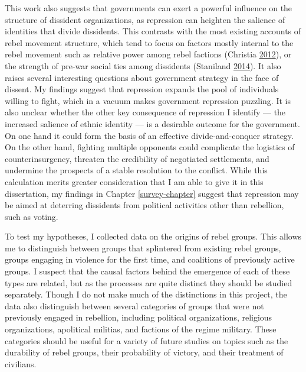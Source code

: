 \documentclass[12pt,]{book}
\theoremstyle{definition}
\theoremstyle{definition}
\theoremstyle{definition}
\theoremstyle{remark}
\begin{document}
This work also suggests that governments can exert a powerful influence
on the structure of dissident organizations, as repression can heighten
the salience of identities that divide dissidents. This contrasts with
the most existing accounts of rebel movement structure, which tend to
focus on factors mostly internal to the rebel movement such as relative
power among rebel factions (Christia
\protect\hyperlink{ref-Christia2012}{2012}), or the strength of pre-war
social ties among dissidents (Staniland
\protect\hyperlink{ref-Staniland2014}{2014}). It also raises several
interesting questions about government strategy in the face of dissent.
My findings suggest that repression expands the pool of individuals
willing to fight, which in a vacuum makes government repression
puzzling. It is also unclear whether the other key consequence of
repression I identify --- the increased salience of ethnic identity ---
is a desirable outcome for the government. On one hand it could form the
basis of an effective divide-and-conquer strategy. On the other hand,
fighting multiple opponents could complicate the logistics of
counterinsurgency, threaten the credibility of negotiated settlements,
and undermine the prospects of a stable resolution to the conflict.
While this calculation merits greater consideration that I am able to
give it in this dissertation, my findings in Chapter
\ref{survey-chapter} suggest that repression may be aimed at deterring
dissidents from political activities other than rebellion, such as
voting.

To test my hypotheses, I collected data on the origins of rebel groups.
This allows me to distinguish between groups that splintered from
existing rebel groups, groups engaging in violence for the first time,
and coalitions of previously active groups. I suspect that the causal
factors behind the emergence of each of these types are related, but as
the processes are quite distinct they should be studied separately.
Though I do not make much of the distinctions in this project, the data
also distinguish between several categories of groups that were not
previously engaged in rebellion, including political organizations,
religious organizations, apolitical militias, and factions of the regime
military. These categories should be useful for a variety of future
studies on topics such as the durability of rebel groups, their
probability of victory, and their treatment of civilians.
\end{document}
